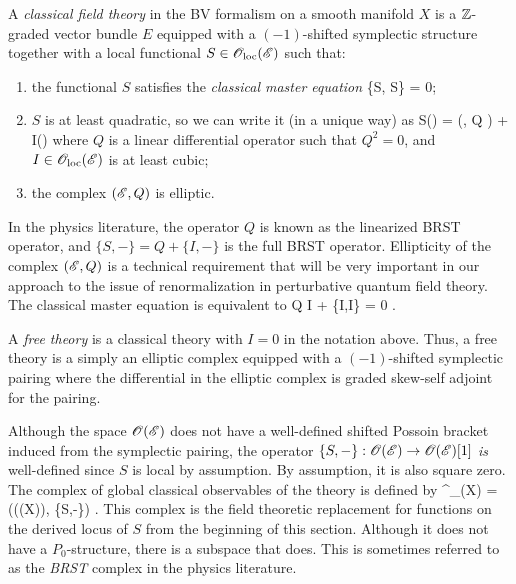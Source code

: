 \documentclass[11pt]{amsart}
\def\brian{\textcolor{blue}{BW: }\textcolor{blue}}
\begin{document}
\begin{dfn} \label{dfn: classical}
A {\em classical field theory} in the BV formalism on a smooth manifold $X$ is a $\mathbb Z$-graded vector bundle $E$ equipped with a $(-1)$-shifted symplectic structure together with a local functional $S \in {\mathscr O}_{\rm loc}(\mathscr E)$ such that:
\begin{enumerate}
\item the functional $S$ satisfies the {\em classical master equation} 
\ben
\{S, S\} = 0;
\een
\item $S$ is at least quadratic, so we can write it (in a unique way) as 
\ben
S(\varphi) = \omega(\varphi, Q \varphi) + I(\varphi)
\een
where $Q$ is a linear differential operator such that $Q^2 = 0$, and  $I \in {\mathscr O}_{\rm loc}(\mathscr E)$ is at least cubic;
\item the complex $(\mathscr E, Q)$ is elliptic.
\end{enumerate}
\end{dfn}

In the physics literature, the operator $Q$ is known as the linearized BRST operator, and $\{S,-\} = Q + \{I,-\}$ is the full BRST operator.
Ellipticity of the complex $(\mathscr E,Q)$ is a technical requirement that will be very important in our approach to the issue of renormalization in perturbative quantum field theory.
The classical master equation is equivalent to
\ben
Q I +  \{I,I\} = 0 .
\een

A {\em free theory} is a classical theory with $I = 0$ in the notation above. 
Thus, a free theory is a simply an elliptic complex equipped with a $(-1)$-shifted symplectic pairing where the differential in the elliptic complex is graded skew-self adjoint for the pairing.  

Although the space $\mathscr O(\mathscr E)$ does not have a well-defined shifted Possoin bracket induced from the symplectic pairing, the operator $\{S,-\} : \mathscr O(\mathscr E) \to \mathscr O(\mathscr E)[1]$ {\em is} well-defined since $S$ is local by assumption. 
By assumption, it is also square zero. 
The complex of global classical observables of the theory is defined by
\ben
\Obs^{\cl}_{\sE}(X) = (\sO(\sE(X)), \{S,-\}) .
\een
This complex is the field theoretic replacement for functions on the derived locus of $S$ from the beginning of this section.
Although it does not have a $P_0$-structure, there is a subspace that does. 
This is sometimes referred to as the {\em BRST} complex in the physics literature.

\end{document}
